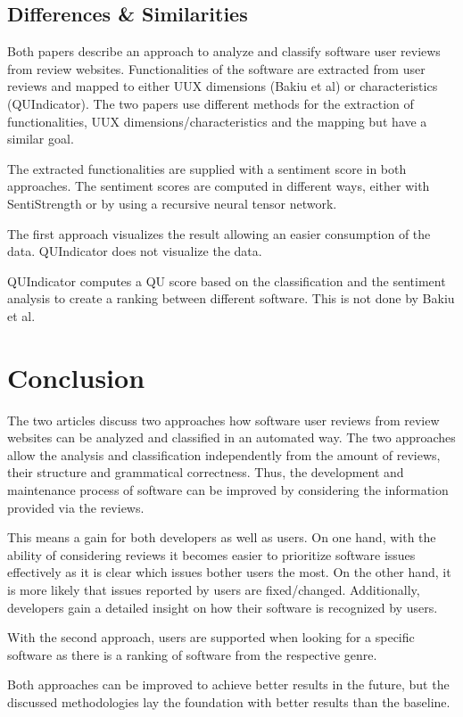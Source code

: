 \subsection{Differences \& Similarities}
Both papers describe an approach to analyze and classify software user reviews from review websites. Functionalities of the software are extracted from user reviews and mapped to either UUX dimensions (Bakiu et al) or characteristics (QUIndicator). The two papers use different methods for the extraction of functionalities, UUX dimensions/characteristics and the mapping but have a similar goal.

The extracted functionalities are supplied with a sentiment score in both approaches. The sentiment scores are computed in different ways, either with SentiStrength or by using a recursive neural tensor network.

The first approach visualizes the result allowing an easier consumption of the data. QUIndicator does not visualize the data.

QUIndicator computes a QU score based on the classification and the sentiment analysis to create a ranking between different software. This is not done by Bakiu et al.

\section{Conclusion}
The two articles discuss two approaches how software user reviews from review websites can be analyzed and classified in an automated way. The two approaches allow the analysis and classification independently from the amount of reviews, their structure and grammatical correctness. Thus, the development and maintenance process of software can be improved by considering the information provided via the reviews.

This means a gain for both developers as well as users. On one hand, with the ability of considering reviews it becomes easier to prioritize software issues effectively as it is clear which issues bother users the most. On the other hand, it is more likely that issues reported by users are fixed/changed. Additionally, developers gain a detailed insight on how their software is recognized by users.

With the second approach, users are supported when looking for a specific software as there is a ranking of software from the respective genre.

Both approaches can be improved to achieve better results in the future, but the discussed methodologies lay the foundation with better results than the baseline.
